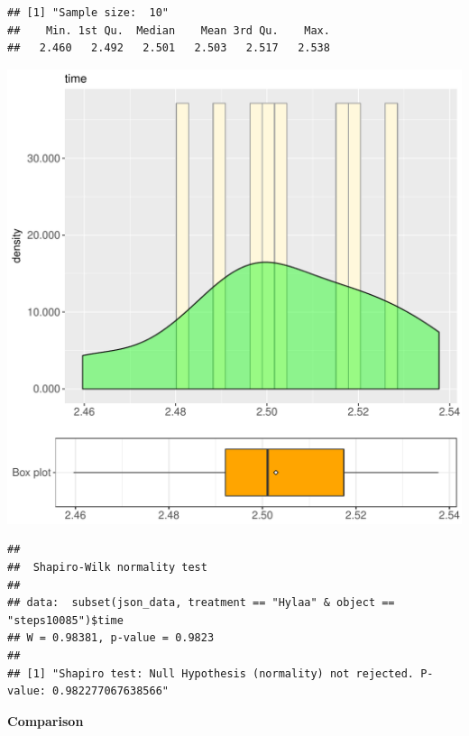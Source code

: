 \documentclass{article}\usepackage[]{graphicx}\usepackage[]{color}
\makeatletter
\def\maxwidth{ %
  \ifdim\Gin@nat@width>\linewidth
    \linewidth
  \else
    \Gin@nat@width
  \fi
}
\newenvironment{kframe}{%
 \def\at@end@of@kframe{}%
 \ifinner\ifhmode%
  \def\at@end@of@kframe{\end{minipage}}%
  \begin{minipage}{\columnwidth}%
 \fi\fi%
 \def\FrameCommand##1{\hskip\@totalleftmargin \hskip-\fboxsep
 \colorbox{shadecolor}{##1}\hskip-\fboxsep
     \hskip-\linewidth \hskip-\@totalleftmargin \hskip\columnwidth}%
 \MakeFramed {\advance\hsize-\width
   \@totalleftmargin\z@ \linewidth\hsize
   \@setminipage}}%
 {\par\unskip\endMakeFramed%
 \at@end@of@kframe}
\newenvironment{knitrout}{}{} %
\makeatother
\begin{document}
\begin{knitrout}
\color{fgcolor}\begin{kframe}
\begin{verbatim}
## [1] "Sample size:  10"
##    Min. 1st Qu.  Median    Mean 3rd Qu.    Max. 
##   2.460   2.492   2.501   2.503   2.517   2.538
\end{verbatim}
\end{kframe}
\includegraphics[width=\maxwidth]{figure/RH2_Hylaa_steps10085-1} 
\begin{kframe}\begin{verbatim}
## 
## 	Shapiro-Wilk normality test
## 
## data:  subset(json_data, treatment == "Hylaa" & object == "steps10085")$time
## W = 0.98381, p-value = 0.9823
## 
## [1] "Shapiro test: Null Hypothesis (normality) not rejected. P-value: 0.982277067638566"
\end{verbatim}
\end{kframe}
\end{knitrout}
  
 \textbf{Comparison}
  
\end{document}
